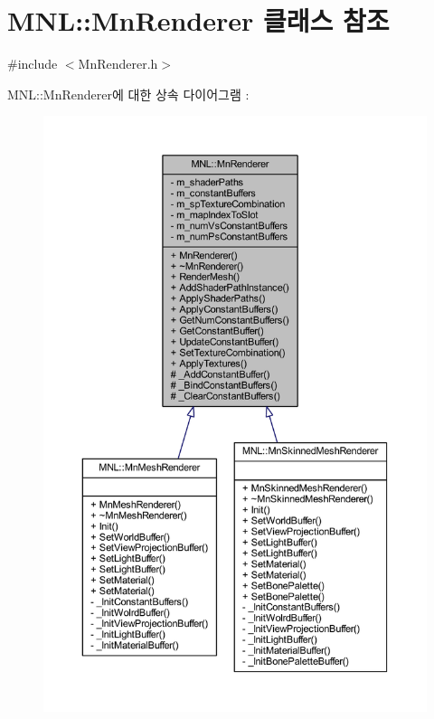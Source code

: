 \hypertarget{class_m_n_l_1_1_mn_renderer}{}\section{M\+NL\+:\+:Mn\+Renderer 클래스 참조}
\label{class_m_n_l_1_1_mn_renderer}


{\ttfamily \#include $<$Mn\+Renderer.\+h$>$}



M\+NL\+:\+:Mn\+Renderer에 대한 상속 다이어그램 \+: \nopagebreak
\begin{figure}[H]
\begin{center}
\leavevmode
\includegraphics[width=350pt]{class_m_n_l_1_1_mn_renderer__inherit__graph}
\end{center}
\end{figure}


